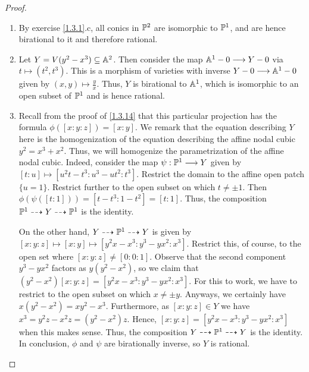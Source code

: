 \begin{proof}
    \begin{enumerate}[label = (\alph*)]
        \item By exercise \ref{1.3.1}.c, all conics in $\P^2$ are isomorphic to $\P^1$, and are hence birational to it and therefore rational.

        \item Let $Y = V(y^2 - x^3) \subseteq \A^2$. Then consider the map $\A^1 - 0 \longrightarrow Y - 0$ via $t \mapsto (t^2, t^3)$. This is a morphism of varieties with inverse $Y - 0 \longrightarrow \A^1 - 0$ given by $(x, y) \mapsto \frac{y}{x}$. Thus, $Y$ is birational to $\A^1$, which is isomorphic to an open subset of $\P^1$ and is hence rational.

        \item Recall from the proof of \ref{1.3.14} that this particular projection has the formula $\phi([x:y:z]) = [x:y]$. We remark that the equation describing $Y$ here is the homogenization of the equation describing the affine nodal cubic $y^2 = x^3 + x^2$. Thus, we will homogenize the parametrization of the affine nodal cubic. Indeed, consider the map $\psi: \P^1 \longrightarrow Y$ given by $[t : u] \mapsto [u^2 t - t^3 : u^3 - u t^2 : t^3]$. Restrict the domain to the affine open patch $\{u = 1\}$. Restrict further to the open subset on which $t \neq \pm 1$. Then $\phi(\psi([t:1])) = [t - t^3 : 1 - t^2] = [t : 1]$. Thus, the composition $\P^1 \dashrightarrow Y \dashrightarrow \P^1$ is the identity.

        On the other hand, $Y \dashrightarrow \P^1 \dashrightarrow Y$ is given by $[x : y : z] \mapsto [x : y] \mapsto [y^2 x - x^3 : y^3 - y x^2 : x^3]$. Restrict this, of course, to the open set where $[x:y:z] \neq [0:0:1]$. Observe that the second component $y^3 - y x^2$ factors as $y (y^2 - x^2)$, so we claim that $(y^2 - x^2) [x : y : z] = [y^2 x - x^3 : y^3 - y x^2 : x^3]$. For this to work, we have to restrict to the open subset on which $x \neq \pm y$. Anyways, we certainly have $x (y^2 - x^2) = xy^2 - x^3$. Furthermore, as $[x : y : z] \in Y$ we have $x^3 = y^2z - x^2 z = (y^2 - x^2)z$. Hence, $[x : y : z] = [y^2 x - x^3 : y^3 - y x^2 : x^3]$ when this makes sense. Thus, the composition $Y \dashrightarrow \P^1 \dashrightarrow Y$ is the identity. In conclusion, $\phi$ and $\psi$ are birationally inverse, so $Y$ is rational.
    \end{enumerate}
\end{proof}
